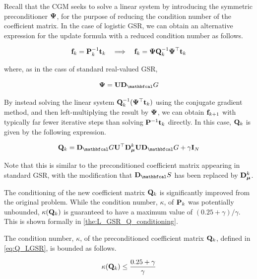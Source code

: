 Recall that the CGM seeks to solve a linear system by introducing the symmetric preconditioner $\mathbf{\Psi}$, for the purpose of reducing the condition number of the coefficient matrix. In the case of logistic GSR, we can obtain an alternative expression for the update formula with a reduced condition number as follows. 

\begin{equation*}
    \mathbf{f}_k = \mathbf{P}^{-1}_k \mathbf{t}_k \quad \Longrightarrow \quad \mathbf{f}_k = \mathbf{\Psi} \mathbf{Q}_k^{-1} \mathbf{\Psi}^\top \mathbf{t}_k
\end{equation*}

where, as in the cass of standard real-valued GSR, 

\begin{equation*}
    \PSI = \U \D_\Gt
\end{equation*}

By instead solving the linear system $\mathbf{Q}_k^{-1} (\mathbf{\Psi}^\top \mathbf{t}_k)$ using the conjugate gradient method, and then left-multiplying the result by $\mathbf{\Psi}$, we can obtain $\mathbf{f}_{k+1}$ with typically far fewer iterative steps than solving $\mathbf{P}^{-1} \mathbf{t}_k$ directly. In this case, $\mathbf{Q}_k$ is given by the following expression. 

\begin{equation}
    \label{eq:Q_LGSR}
    \Q_k = \D_\Gt \U^\top \D_{\muu}^k \U \D_\Gt + \gamma \I_N
\end{equation}

Note that this is similar to the preconditioned coefficient matrix appearing in standard GSR, with the modification that $\D_\St$ has been replaced by $\mathbf{D}_{\boldsymbol{\mu}}^k$. 

The conditioning of the new coefficient matrix $\mathbf{Q}_k$ is significantly improved from the original problem. While the condition number, $\kappa$, of $\mathbf{P}_k$ was potentially unbounded, $\kappa(\mathbf{Q}_k)$ is guaranteed to have a maximum value of $(0.25 + \gamma) / \gamma$.  This is shown formally in \cref{the:L_GSR_Q_conditioning}. 

\begin{theorem}
    \label{the:L_GSR_Q_conditioning}
    
    The condition number, $\kappa$, of the preconditioned coefficient matrix $\mathbf{Q}_k$, defined in \cref{eq:Q_LGSR}, is bounded as follows. 
    
    \begin{equation}
        \kappa(\mathbf{Q}_k) \leq \frac{0.25 + \gamma}{\gamma}
    \end{equation}

\end{theorem}

